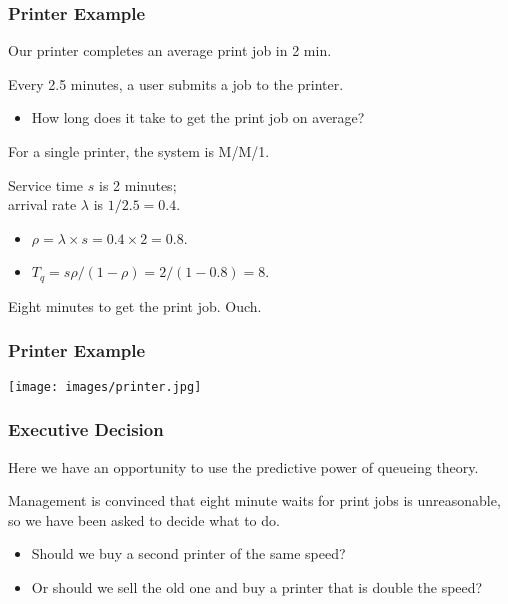 \begin{frame}
\frametitle{Printer Example}

\large
\begin{changemargin}{1.5cm}
Our printer completes an average print job in 2 min. 

Every 2.5 minutes, a user submits a job to the printer. 

\begin{itemize}
\item How long does it take to get the print job on average? 
\end{itemize}

For a single printer, the system is M/M/1. 

Service time $s$ is 2 minutes; \\
arrival rate $\lambda$ is $1/2.5 = 0.4$. 

\begin{itemize}
\item $\rho = \lambda \times s = 0.4 \times 2 = 0.8$. 
\item $T_{q} = s\rho / (1 - \rho ) = 2 / (1 -0.8 ) = 8$. 
\end{itemize}

Eight minutes to get the print job. Ouch.
\end{changemargin}

\end{frame}

\begin{frame}
\frametitle{Printer Example}

\begin{center}
	\texttt{[image: images/printer.jpg]}
\end{center}


\end{frame}

\begin{frame}
\frametitle{Executive Decision}

\large
\begin{changemargin}{1.5cm}
Here we have an opportunity to use the predictive power of queueing theory. 

Management is convinced that eight minute waits for print jobs is unreasonable, so we have been asked to decide what to do. 

\begin{itemize}
\item Should we buy a second printer of the same speed?
\item Or should we sell the old one and buy a printer that is double the speed?
\end{itemize}
\end{changemargin}

\end{frame}




